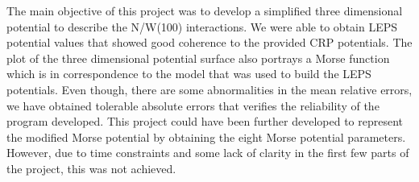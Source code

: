 \documentclass[12pt]{article}
\begin{document}
The main objective of this project was to develop a simplified three dimensional potential to describe the N/W(100) interactions. We were able to obtain LEPS potential values that showed good coherence to the provided CRP potentials. The plot of the three dimensional potential surface also portrays a Morse function which is in correspondence to the model that was used to build the LEPS potentials. Even though, there are some abnormalities in the mean relative errors, we have obtained tolerable absolute errors that verifies the reliability of the program developed. This project could have been further developed to represent the modified Morse potential by obtaining the eight Morse potential parameters. However, due to time constraints and some lack of clarity in the first few parts of the project, this was not achieved.
\end{document}
